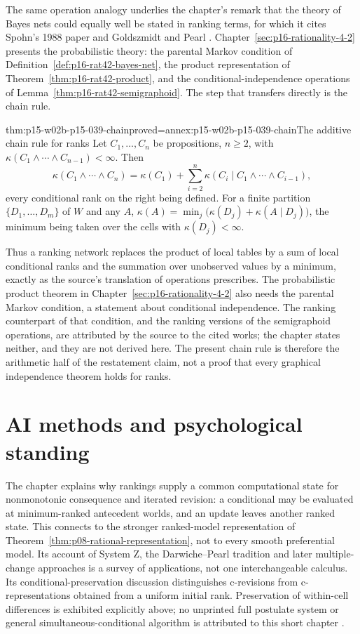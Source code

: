 The same operation analogy underlies the chapter's remark that the theory of
Bayes nets could equally well be stated in ranking terms, for which it cites
Spohn's 1988 paper and Goldszmidt and Pearl
\parencite[p.~340]{KernIsbernerSkovgaardOlsenSpohn2021Ranking}.
Chapter~\ref{sec:p16-rationality-4-2} presents the probabilistic theory: the
parental Markov condition of Definition~\ref{def:p16-rat42-bayes-net}, the
product representation of Theorem~\ref{thm:p16-rat42-product}, and the
conditional-independence operations of Lemma~\ref{thm:p16-rat42-semigraphoid}.
The step that transfers directly is the chain rule.

\begin{hbtheorem}{thm:p15-w02b-p15-039-chain}{proved=annex:p15-w02b-p15-039-chain}{The additive chain rule for ranks}
Let \(C_1,\ldots,C_n\) be propositions, \(n\geq2\), with
\(\kappa(C_1\land\cdots\land C_{n-1})<\infty\).  Then
\[
 \kappa(C_1\land\cdots\land C_n)=\kappa(C_1)+\sum_{i=2}^{n}
 \kappa(C_i\mid C_1\land\cdots\land C_{i-1}),
\]
every conditional rank on the right being defined.  For a finite partition
\(\{D_1,\ldots,D_m\}\) of \(W\) and any \(A\),
\(\kappa(A)=\min_j\bigl(\kappa(D_j)+\kappa(A\mid D_j)\bigr)\), the minimum
being taken over the cells with \(\kappa(D_j)<\infty\).
\end{hbtheorem}

Thus a ranking network replaces the product of local tables by a sum of local
conditional ranks and the summation over unobserved values by a minimum,
exactly as the source's translation of operations prescribes.  The
probabilistic product theorem in Chapter~\ref{sec:p16-rationality-4-2} also
needs the parental Markov condition, a statement about conditional
independence.  The ranking counterpart of that condition, and the ranking
versions of the semigraphoid operations, are attributed by the source to
the cited works; the chapter states neither, and they are not derived here.
The present chain rule is therefore the arithmetic half of the restatement
claim, not a proof that every graphical independence theorem holds for ranks.

\section{AI methods and psychological standing}

The chapter explains why rankings supply a common computational state for
nonmonotonic consequence and iterated revision: a conditional may be evaluated
at minimum-ranked antecedent worlds, and an update leaves another ranked
state.  This connects to the stronger ranked-model representation of
Theorem~\ref{thm:p08-rational-representation}, not to every smooth preferential
model.  Its account of System Z, the Darwiche--Pearl tradition and later
multiple-change approaches is a survey of applications, not one interchangeable
calculus.  Its conditional-preservation discussion distinguishes c-revisions
from c-representations obtained from a uniform initial rank.  Preservation
of within-cell differences is exhibited explicitly above; no unprinted full
postulate system or general simultaneous-conditional algorithm is attributed
to this short chapter \parencite[pp.~341--342]{KernIsbernerSkovgaardOlsenSpohn2021Ranking}.

